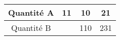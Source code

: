 \begin{tabular}{|c|c|c|c|}
\hline
Quantité A & 11 & 10 & 21 \\ \hline
Quantité B & \kern1cm & 110 & 231 \\ \hline
\end{tabular}

